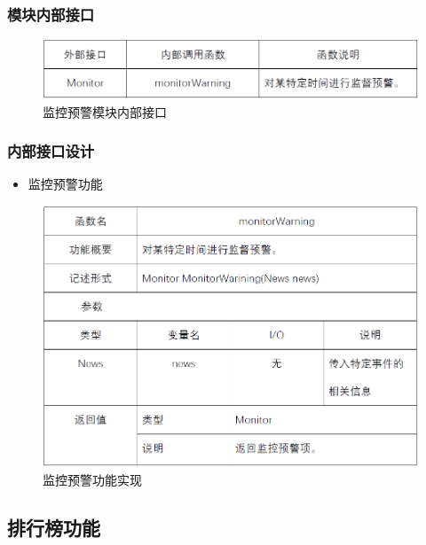 \subsubsection{模块内部接口}
\begin{figure}[!htbp]
	\centering
	\includegraphics[scale=0.7]{image/b15.png} %
	\caption{监控预警模块内部接口} %
\end{figure}
\subsubsection{内部接口设计}
\begin{itemize}
	\item 监控预警功能
\end{itemize}
\begin{figure}[!htbp]
	\centering
	\includegraphics[scale=0.7]{image/b16.png} %
	\caption{监控预警功能实现} %
\end{figure}
\subsection{排行榜功能}

